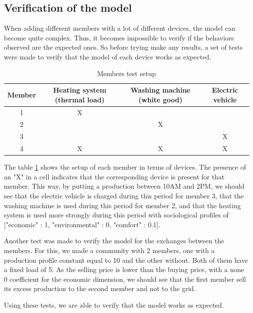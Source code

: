 \subsection{Verification of the model}

When adding different members with a lot of different devices, the model can become quite complex. Thus, it becomes impossible to verify if the behaviors observed are the expected ones. So before trying make any results, a set of tests were made to verify that the model of each device works as expected.

\begin{table}[h]
    \centering
    \begin{tabular}{|c|c|c|c|}
        \hline
        Member & Heating system (thermal load) & Washing machine (white good) & Electric vehicle \\ \hline
        1      & X  &    &    \\ \hline
        2      &   & X &     \\ \hline
        3      &   &  & X   \\ \hline
        4      & X   & X  & X   \\ \hline
    \end{tabular}
    \caption{Members test setup}
    \label{tab:test_members}
\end{table}

The table \ref{tab:test_members} shows the setup of each member in terms of devices. The presence of an "X" in a cell indicates that the corresponding device is present for that member. This way, by putting a production between 10AM and 2PM, we should see that the electric vehicle is charged during this period for member 3, that the washing machine is used during this period for member 2, and that the heating system is used more strongly during this period with sociological profiles of ["economic" : 1, "environmental" : 0, "comfort" : 0.1].

Another test was made to verify the model for the exchanges between the members. For this, we made a community with 2 members, one with a production profile constant equal to 10 and the other without. Both of them have a fixed load of 5. As the selling price is lower than the buying price, with a none 0 coefficient for the economic dimension, we should see that the first member sell its excess production to the second member and not to the grid.

Using these tests, we are able to verify that the model works as expected.

